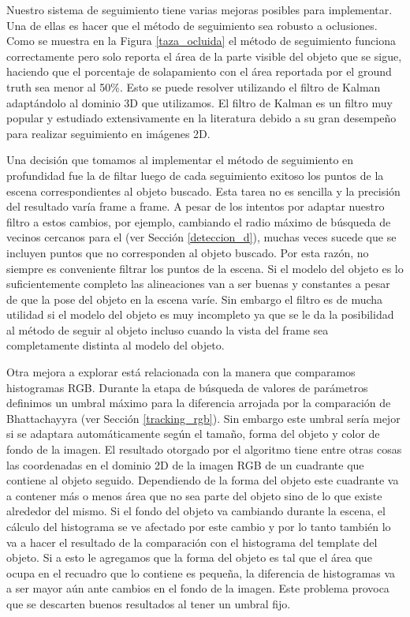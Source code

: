 Nuestro sistema de seguimiento tiene varias mejoras posibles para implementar. Una de ellas es hacer que el método de seguimiento sea robusto a oclusiones. Como se muestra en la Figura \ref{taza_ocluida} el método de seguimiento funciona correctamente pero solo reporta el área de la parte visible del objeto que se sigue, haciendo que el porcentaje de solapamiento con el área reportada por el ground truth sea menor al 50\%. Esto se puede resolver utilizando el filtro de Kalman \cite{welch1995introduction} adaptándolo al dominio 3D que utilizamos. El filtro de Kalman es un filtro muy popular y estudiado extensivamente en la literatura \cite{julier1997new,wan2000unscented} debido a su gran desempeño para realizar seguimiento en imágenes 2D.

Una decisión que tomamos al implementar el método de seguimiento en profundidad fue la de filtar luego de cada seguimiento exitoso los puntos de la escena correspondientes al objeto buscado. Esta tarea no es sencilla y la precisión del resultado varía frame a frame. A pesar de los intentos por adaptar nuestro filtro a estos cambios, por ejemplo, cambiando el radio máximo de búsqueda de vecinos cercanos para el \kdt (ver Sección \ref{deteccion_d}), muchas veces sucede que se incluyen puntos que no corresponden al objeto buscado. Por esta razón, no siempre es conveniente filtrar los puntos de la escena. Si el modelo del objeto es lo suficientemente completo las alineaciones van a ser buenas y constantes a pesar de que la pose del objeto en la escena varíe. Sin embargo el filtro es de mucha utilidad si el modelo del objeto es muy incompleto ya que se le da la posibilidad al método de seguir al objeto incluso cuando la vista del frame sea completamente distinta al modelo del objeto.

Otra mejora a explorar está relacionada con la manera que comparamos histogramas RGB. Durante la etapa de búsqueda de valores de parámetros definimos un umbral máximo para la diferencia arrojada por la comparación de Bhattachayyra (ver Sección \ref{tracking_rgb}). Sin embargo este umbral sería mejor si se adaptara automáticamente según el tamaño, forma del objeto y color de fondo de la imagen. El resultado otorgado por el algoritmo tiene entre otras cosas las coordenadas en el dominio 2D de la imagen RGB de un cuadrante que contiene al objeto seguido. Dependiendo de la forma del objeto este cuadrante va a contener más o menos área que no sea parte del objeto sino de lo que existe alrededor del mismo. Si el fondo del objeto va cambiando durante la escena, el cálculo del histograma se ve afectado por este cambio y por lo tanto también lo va a hacer el resultado de la comparación con el histograma del template del objeto. Si a esto le agregamos que la forma del objeto es tal que el área que ocupa en el recuadro que lo contiene es pequeña, la diferencia de histogramas va a ser mayor aún ante cambios en el fondo de la imagen. Este problema provoca que se descarten buenos resultados al tener un umbral fijo.

